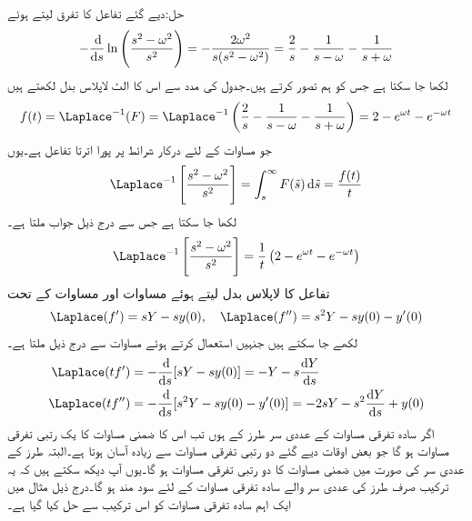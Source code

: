 حل:دیے گئے تفاعل کا تفرق لیتے ہوئے
\begin{align*}
-\frac{\dif}{\dif s}\ln\left(\frac{s^2-\omega^2}{s^2}\right)=-\frac{2\omega^2}{s(s^2-\omega^2)}=\frac{2}{s}-\frac{1}{s-\omega}-\frac{1}{s+\omega}
\end{align*}
لکھا جا سکتا ہے جس کو ہم  تصور کرتے ہیں۔جدول  کی مدد سے اس کا الٹ لاپلاس بدل لکھتے ہیں
\begin{align*}
f(t)=\Laplace^{-1}(F)=\Laplace^{-1}\left(\frac{2}{s}-\frac{1}{s-\omega}-\frac{1}{s+\omega}\right)=2-e^{\omega t}-e^{-\omega t}
\end{align*} 
جو مساوات  کے لئے درکار شرائط پر پورا اترتا تفاعل ہے۔یوں
\begin{align*}
\Laplace^{-1}\left[\frac{s^2-\omega^2}{s^2}\right]=\int_{s}^{\infty}F(\tilde{s})\dif \tilde{s}=\frac{f(t)}{t}
\end{align*}
لکھا جا سکتا ہے جس سے درج ذیل جواب ملتا ہے۔
\begin{align*}
\Laplace^{-1}\left[\frac{s^2-\omega^2}{s^2}\right]=\frac{1}{t}\left(2-e^{\omega t}-e^{-\omega t}\right)
\end{align*}
تفاعل  کا لاپلاس بدل  لیتے ہوئے مساوات  اور مساوات  کے تحت
\begin{align*}
\Laplace(f')=sY-sy(0),\quad \Laplace(f'')=s^2Y-sy(0)-y'(0)
\end{align*}
لکھے جا سکتے ہیں جنہیں استعمال کرتے ہوئے مساوات  سے درج ذیل ملتا ہے۔
\begin{gather}
\begin{aligned}\label{مساوات_لاپلاس_لاگیغ_الف}
\Laplace(tf')&=-\frac{\dif}{\dif s}[sY-sy(0)]=-Y-s\frac{\dif Y}{\dif s}\\
\Laplace(tf'')&=-\frac{\dif}{\dif s}[s^2Y-sy(0)-y'(0)]=-2sY-s^2\frac{\dif Y}{\dif s}+y(0)
\end{aligned}
\end{gather}
اگر سادہ تفرقی مساوات کے عددی سر  طرز کے ہوں تب اس کا ضمنی مساوات  کا یک رتبی تفرقی مساوات ہو گا جو بعض اوقات دیے گئے دو رتبی تفرقی مساوات سے زیادہ آسان ہوتا ہے۔البتہ  طرز کے عددی سر کی صورت میں ضمنی مساوات  کا دو رتبی تفرقی مساوات ہو گا۔یوں آپ دیکھ سکتے ہیں کہ یہ ترکیب صرف  طرز کی عددی سر والے سادہ تفرقی مساوات کے لئے سود مند ہو گا۔درج ذیل مثال میں ایک اہم سادہ تفرقی مساوات کو اس ترکیب سے حل کیا گیا ہے۔

